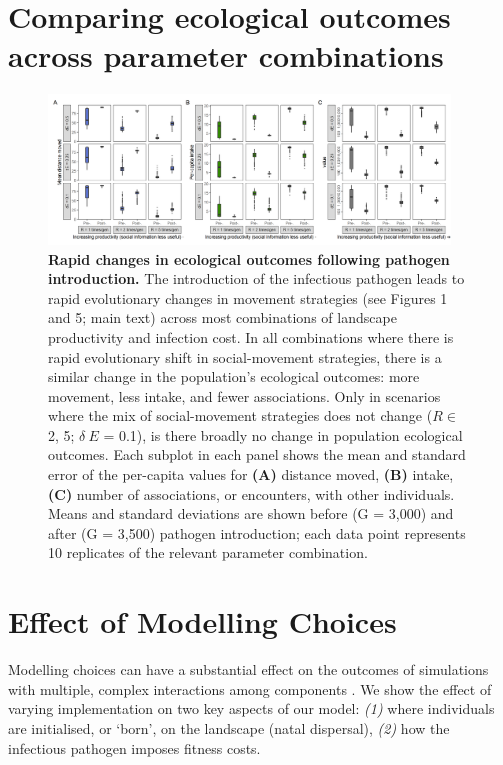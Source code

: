 \section*{Comparing ecological outcomes across parameter combinations}

\begin{figure}
    \centering
    \includegraphics[width=0.95\textwidth]{figures/pathomove/fig_eco_compare_default.png}
    \caption{
        \textbf{Rapid changes in ecological outcomes following pathogen introduction.} 
        The introduction of the infectious pathogen leads to rapid evolutionary changes in movement strategies (see Figures 1 and 5; main text) across most combinations of landscape productivity and infection cost. 
        In all combinations where there is rapid evolutionary shift in social-movement strategies, there is a similar change in the population's ecological outcomes: more movement, less intake, and fewer associations. 
        Only in scenarios where the mix of social-movement strategies does not change (\(R \in\) 2, 5; $\delta~E$ = 0.1), is there broadly no change in population ecological outcomes. 
        Each subplot in each panel shows the mean and standard error of the per-capita values for \textbf{(A)} distance moved, \textbf{(B)} intake, \textbf{(C)} number of associations, or encounters, with other individuals. 
        Means and standard deviations are shown before (G = 3,000) and after (G = 3,500) pathogen introduction; each data point represents 10 replicates of the relevant parameter combination.
    }\label{fig:patho_eco_compare}
\end{figure}

\section*{Effect of Modelling Choices}

Modelling choices can have a substantial effect on the outcomes of simulations with multiple, complex interactions among components \parencite{scherer2020,gupte2021a,netz2021}.
We show the effect of varying implementation on two key aspects of our model: \textit{(1)} where individuals are initialised, or `born', on the landscape (natal dispersal), \textit{(2)} how the infectious pathogen imposes fitness costs.

